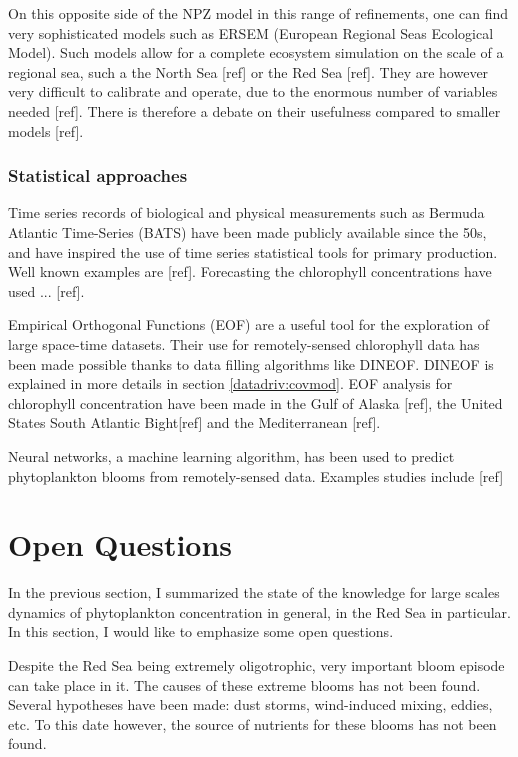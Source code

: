 			On this opposite side of the NPZ model in this range of refinements, one can find very sophisticated models such as ERSEM (European Regional Seas Ecological Model). Such models allow for a complete ecosystem simulation on the scale of a regional sea, such a the North Sea [ref] or the Red Sea [ref]. They are however very difficult to calibrate and operate, due to the enormous number of variables needed [ref]. There is therefore a debate on their usefulness compared to smaller models [ref]. 

		\subsubsection{Statistical approaches}

			Time series records of biological and physical measurements such as Bermuda Atlantic Time-Series (BATS) have been made publicly available since the 50s, and have inspired the use of time series statistical tools for primary production. Well known examples are [ref]. Forecasting the chlorophyll concentrations have used ... [ref].

			Empirical Orthogonal Functions (EOF) are a useful tool for the exploration of large space-time datasets. Their use for remotely-sensed chlorophyll data has been made possible thanks to data filling algorithms like DINEOF. DINEOF is explained in more details in section \ref{datadriv:covmod}. EOF analysis for chlorophyll concentration have been made in the Gulf of Alaska [ref], the United States South Atlantic Bight[ref] and the Mediterranean [ref].

			Neural networks, a machine learning algorithm, has been used to predict phytoplankton blooms from remotely-sensed data. Examples studies include [ref]

\section{Open Questions}
\label{intro:questions}

	In the previous section, I summarized the state of the knowledge for large scales dynamics of phytoplankton concentration in general, in the Red Sea in particular. In this section, I would like to emphasize some open questions. 

	Despite the Red Sea being extremely oligotrophic, very important bloom episode can take place in it. The causes of these extreme blooms has not been found. Several hypotheses have been made: dust storms, wind-induced mixing, eddies, etc. To this date however, the source of nutrients for these blooms has not been found.

